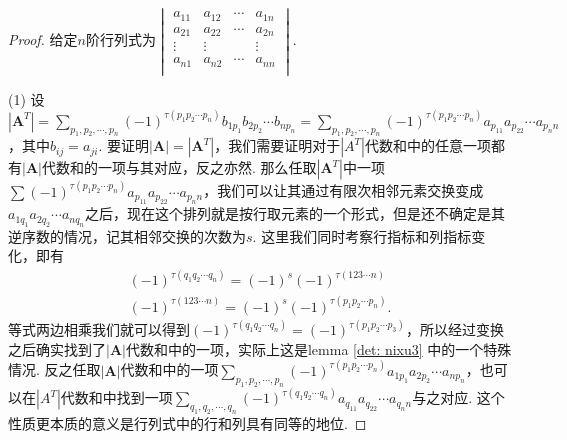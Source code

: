 \documentclass{article}
\begin{document}
\begin{proof}
给定$n$阶行列式为$\begin{vmatrix}
a_{11} & a_{12} & \cdots & a_{1n} \\
a_{21} & a_{22} & \cdots & a_{2n} \\
\vdots & \vdots & 		 & \vdots \\
a_{n1} & a_{n2} & \cdots & a_{nn} \\
\end{vmatrix}$.

{\color{red}(1)} 设$|\mathbf{A}^T|=\sum\limits_{p_1,p_2,\cdots,p_n} (-1)^{\tau(p_1p_2\cdots p_n)} b_{1p_1}b_{2p_2}\cdots b_{np_n} = \sum\limits_{p_1,p_2,\cdots,p_n} (-1)^{\tau(p_1p_2\cdots p_n)} a_{p_11}a_{p_22}\cdots a_{p_nn}$，其中$b_{ij} = a_{ji}$. 要证明$|\mathbf{A}| = |\mathbf{A}^T|$，{\color{blue}我们需要证明对于$|A^T|$代数和中的任意一项都有$|\mathbf{A}|$代数和的一项与其对应，反之亦然}. 那么任取$|\mathbf{A}^T|$中一项$\sum\limits (-1)^{\tau(p_1p_2\cdots p_n)} a_{p_11}a_{p_22}\cdots a_{p_nn}$，我们可以让其通过有限次相邻元素交换变成$a_{1q_1}a_{2q_2}\cdots a_{nq_n}$之后，现在这个排列就是按行取元素的一个形式，但是还不确定是其逆序数的情况，记其相邻交换的次数为$s$. 这里我们同时考察行指标和列指标变化，即有
$$
\begin{array}{ll}
(-1)^{\tau(q_1q_2\cdots q_n)} = (-1)^{s} (-1)^{\tau(123\cdots n)} \\
(-1)^{\tau(123\cdots n)} = (-1)^{s} (-1)^{\tau(p_1p_2\cdots p_n)}.
\end{array}
$$ 
等式两边相乘我们就可以得到$(-1)^{\tau(q_1q_2\cdots q_n)} = (-1)^{\tau(p_1p_2\cdots p_3)}$，所以经过变换之后确实找到了$|\mathbf{A}|$代数和中的一项，实际上这是lemma \ref{det: nixu3} 中的一个特殊情况. 反之任取$|\mathbf{A}|$代数和中的一项$\sum\limits_{p_1,p_2,\cdots,p_n}(-1)^{\tau(p_1p_2\cdots p_n)}a_{1p_1}a_{2p_2}\cdots a_{np_n}$，也可以在$|A^T|$代数和中找到一项$\sum\limits_{q_1,q_2,\cdots,q_n}(-1)^{\tau(q_1q_2\cdots q_n)}a_{q_11}a_{q_22}\cdots a_{q_nn}$与之对应. {\color{blue}这个性质更本质的意义是行列式中的行和列具有同等的地位}.



\end{proof}
\end{document}
